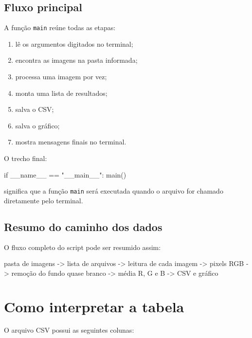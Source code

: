 \documentclass[12pt]{article}
\begin{document}
\subsection{Fluxo principal}

A função \texttt{main} reúne todas as etapas:

\begin{enumerate}
  \item lê os argumentos digitados no terminal;
  \item encontra as imagens na pasta informada;
  \item processa uma imagem por vez;
  \item monta uma lista de resultados;
  \item salva o CSV;
  \item salva o gráfico;
  \item mostra mensagens finais no terminal.
\end{enumerate}

O trecho final:

\begin{codebox}
if __name__ == "__main__":
    main()
\end{codebox}

significa que a função \texttt{main} será executada quando o arquivo for chamado diretamente pelo terminal.

\subsection{Resumo do caminho dos dados}

O fluxo completo do script pode ser resumido assim:

\begin{codebox}
pasta de imagens
      -> lista de arquivos
      -> leitura de cada imagem
      -> pixels RGB
      -> remoção do fundo quase branco
      -> média R, G e B
      -> CSV e gráfico
\end{codebox}

\section{Como interpretar a tabela}

O arquivo CSV possui as seguintes colunas:
\end{document}
